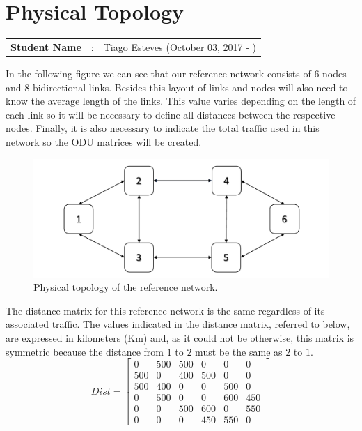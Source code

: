 \clearpage

\section{Physical Topology}\label{Reference_Network_Topology}
\begin{tcolorbox}	
\begin{tabular}{p{2.75cm} p{0.2cm} p{10.5cm}} 	
\textbf{Student Name}  &:& Tiago Esteves    (October 03, 2017 - )\\
\end{tabular}
\end{tcolorbox}
\vspace{11pt}

In the following figure we can see that our reference network consists of 6 nodes and 8 bidirectional links.
Besides this layout of links and nodes will also need to know the average length of the links.
This value varies depending on the length of each link so it will be necessary to define all distances between the respective nodes.
Finally, it is also necessary to indicate the total traffic used in this network so the ODU matrices will be created.\\

\begin{figure}[h!]
\centering
\includegraphics[width=\textwidth]{sdf/reference_network/figures/RedeTeste}
\caption{Physical topology of the reference network.}
\end{figure}

\vspace{11pt}
The distance matrix for this reference network is the same regardless of its associated traffic.
The values indicated in the distance matrix, referred to below, are expressed in kilometers (Km) and, as it could not be otherwise, this matrix is symmetric because the distance from $1$ to $2$ must be the same as $2$ to $1$.\\

\[
Dist=
  \begin{bmatrix}
    0 & 500 & 500 & 0 & 0 & 0 \\
    500 & 0 & 400 & 500 & 0 & 0 \\
    500 & 400 & 0 & 0 & 500 & 0 \\
    0 & 500 & 0 & 0 & 600 & 450 \\
    0 & 0 & 500 & 600 & 0 & 550 \\
    0 & 0 & 0 & 450 & 550 & 0
  \end{bmatrix}
\]

